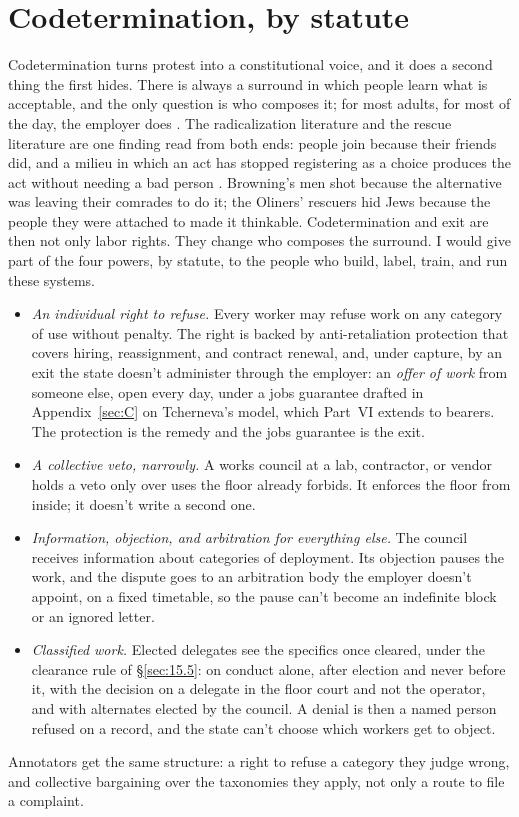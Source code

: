 \section{Codetermination, by statute}
\label{sec:10.1}
Codetermination turns protest into a constitutional voice, and it does a second thing the first hides. There is always a surround in which people learn what is acceptable, and the only question is who composes it; for most adults, for most of the day, the employer does \autocite{anderson2017private}. The radicalization literature and the rescue literature are one finding read from both ends: people join because their friends did, and a milieu in which an act has stopped registering as a choice produces the act without needing a bad person \autocite{sageman2008leaderless,mccauley2008mechanisms,malthaner2014radical}. Browning's men shot because the alternative was leaving their comrades to do it; the Oliners' rescuers hid Jews because the people they were attached to made it thinkable. Codetermination and exit are then not only labor rights. They change who composes the surround. I would give part of the four powers, by statute, to the people who build, label, train, and run these systems.

\begin{itemize}
\item \emph{An individual right to refuse.} Every worker may refuse work on any category of use without penalty. The right is backed by anti-retaliation protection that covers hiring, reassignment, and contract renewal, and, under capture, by an exit the state doesn't administer through the employer: an \emph{offer of work} from someone else, open every day, under a jobs guarantee drafted in Appendix~\ref{sec:C} on Tcherneva's model, which Part~VI extends to bearers. The protection is the remedy and the jobs guarantee is the exit.
\item \emph{A collective veto, narrowly.} A works council at a lab, contractor, or vendor holds a veto only over uses the floor already forbids. It enforces the floor from inside; it doesn't write a second one.
\item \emph{Information, objection, and arbitration for everything else.} The council receives information about categories of deployment. Its objection pauses the work, and the dispute goes to an arbitration body the employer doesn't appoint, on a fixed timetable, so the pause can't become an indefinite block or an ignored letter.
\item \emph{Classified work.} Elected delegates see the specifics once cleared, under the clearance rule of \S\ref{sec:15.5}: on conduct alone, after election and never before it, with the decision on a delegate in the floor court and not the operator, and with alternates elected by the council. A denial is then a named person refused on a record, and the state can't choose which workers get to object.
\end{itemize}

Annotators get the same structure: a right to refuse a category they judge wrong, and collective bargaining over the taxonomies they apply, not only a route to file a complaint.
